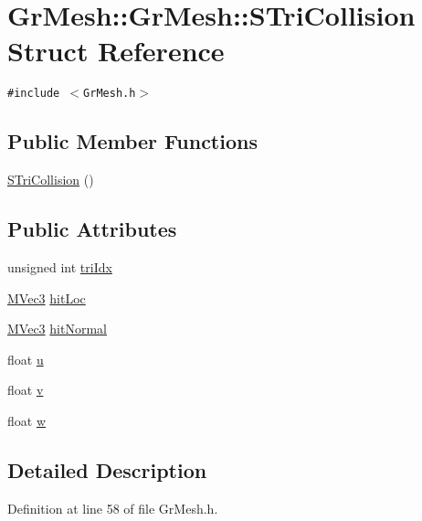 \hypertarget{struct_gr_mesh_1_1_s_tri_collision}{
\section{GrMesh::GrMesh::STriCollision Struct Reference}
\label{struct_gr_mesh_1_1_s_tri_collision}
}
{\tt \#include $<$GrMesh.h$>$}

\subsection*{Public Member Functions}
\begin{CompactItemize}
\item 
\hyperlink{struct_gr_mesh_1_1_s_tri_collision_8adcba53611348585a54dd2227cb0dd1}{STriCollision} ()
\end{CompactItemize}
\subsection*{Public Attributes}
\begin{CompactItemize}
\item 
unsigned int \hyperlink{struct_gr_mesh_1_1_s_tri_collision_625b98685d218e3ffcee8a1802298daf}{triIdx}
\item 
\hyperlink{class_m_vec3}{MVec3} \hyperlink{struct_gr_mesh_1_1_s_tri_collision_3a4997da126ca2145ef6974ba9f4b6c2}{hitLoc}
\item 
\hyperlink{class_m_vec3}{MVec3} \hyperlink{struct_gr_mesh_1_1_s_tri_collision_c0ef99ec1c7b6f52176ac1538e98195a}{hitNormal}
\item 
float \hyperlink{struct_gr_mesh_1_1_s_tri_collision_e6ab3b0597fa4e4e7b8fa40f676af3b1}{u}
\item 
float \hyperlink{struct_gr_mesh_1_1_s_tri_collision_0968edfada1308e305efea20a6fc4eea}{v}
\item 
float \hyperlink{struct_gr_mesh_1_1_s_tri_collision_e2e9284d6e67030d452a77f285849f08}{w}
\end{CompactItemize}


\subsection{Detailed Description}


Definition at line 58 of file GrMesh.h.

